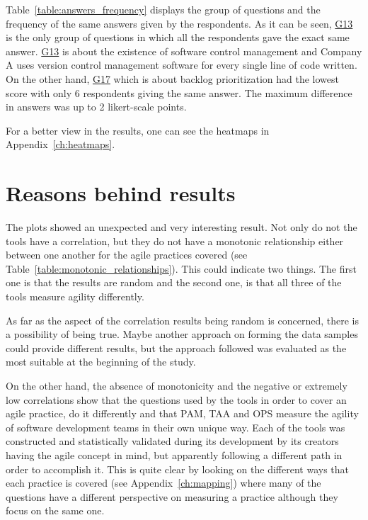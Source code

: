 Table~\ref{table:answers_frequency} displays the group of questions and the frequency of the same answers given by the respondents. As it can be seen, \hyperref[G13]{G13} is the only group of questions in which all the respondents gave the exact same answer. \hyperref[G13]{G13} is about the existence of software control management and Company A uses version control management software for every single line of code written. On the other hand, \hyperref[G17]{G17} which is about backlog prioritization had the lowest score with only 6 respondents giving the same answer. The maximum difference in answers was up to 2 likert-scale points.

For a better view in the results, one can see the heatmaps in Appendix~\ref{ch:heatmaps}.

\section{Reasons behind results}
\label{subsec:reasons_for_correlations}

The plots showed an unexpected and very interesting result. Not only do not the tools have a correlation, but they do not have a monotonic relationship either between one another for the agile practices covered (see Table~\ref{table:monotonic_relationships}). This could indicate two things. The first one is that the results are random and the second one, is that all three of the tools measure agility differently. 

As far as the aspect of the correlation results being random is concerned, there is a possibility of being true. Maybe another approach on forming the data samples could provide different results, but the approach followed was evaluated as the most suitable at the beginning of the study.

On the other hand, the absence of monotonicity and the negative or extremely low correlations show that the questions used by the tools in order to cover an agile practice, do it differently and that \ac{PAM}, \ac{TAA} and \ac{OPS} measure the agility of software development teams in their own unique way. Each of the tools was constructed and statistically validated during its development by its creators having the agile concept in mind, but apparently following a different path in order to accomplish it. This is quite clear by looking on the different ways that each practice is covered (see Appendix~\ref{ch:mapping}) where many of the questions have a different perspective on measuring a practice although they focus on the same one. 

